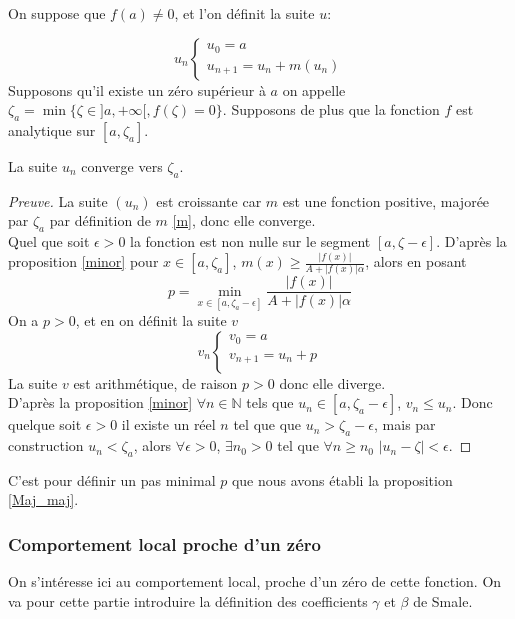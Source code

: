 \documentclass[a4paper,10pt]{article}
\begin{document}
	\noindent On suppose que $f(a) \neq 0$, et l'on définit la suite $u$:
	
	\begin{equation}
	u_n
	\left\lbrace
	\begin{array}{l}
	u_0=a\\
	u_{n+1}=u_n+m(u_n)
	\end{array}\right.
	\end{equation}
	Supposons qu'il existe un zéro supérieur à $a$ on appelle $\zeta_a=\min\{\zeta \in ]a,+\infty[, f(\zeta)=0\}$. Supposons de plus que la fonction $f$ est analytique sur $[a, \zeta_a]$.
	\begin{proposition}
		La suite $u_n$ converge vers $\zeta_a$.
	\end{proposition}
	\begin{proof}[Preuve]
		La suite $(u_n)$ est croissante car $m$ est une fonction positive, majorée par $\zeta_a$ par définition de $m$ \eqref{m}, donc elle converge.\\
		Quel que soit $\epsilon>0$ la fonction est non nulle sur le segment $[a, \zeta-\epsilon]$. D'après la proposition \ref{minor} pour $x \in [a,\zeta_a]$, $m(x)\geq \frac{|f(x)|}{A+|f(x)|\alpha}$,
		alors en posant 
		\[p=\min_{x \in [a,\zeta_a-\epsilon]}\frac{|f(x)|}{A+|f(x)|\alpha}\]
		On a $p>0$, et en on définit la suite $v$ 
		\begin{equation}
		v_n
		\left\lbrace
		\begin{array}{l}
		v_0=a\\
		v_{n+1}=u_n+p\\
		\end{array}\right.
		\end{equation}
		La suite $v$ est arithmétique, de raison $p>0$ donc elle diverge. \\
		D'après la proposition \ref{minor} $ \forall n \in \mathbb{N}$ tels que $u_n \in [a,\zeta_a-\epsilon]$, $v_n\leq u_n$. Donc quelque soit $\epsilon>0$ il existe un réel $n$ tel que que $u_n> \zeta_a-\epsilon$, mais par construction  $u_n<\zeta_a$, alors $\forall \epsilon>0$,  $\exists n_0>0$ tel que $\forall n\geq n_0$  $|u_n-\zeta|<\epsilon$.
	\end{proof}
	C'est pour définir un pas minimal $p$ que nous avons établi la proposition \ref{Maj_maj}.
	
	\subsubsection{Comportement local proche d'un zéro}
	On s'intéresse ici au comportement local, proche d'un zéro de cette fonction.
	On va pour cette partie introduire la définition des coefficients $\gamma$ et $\beta$ de Smale.
	
\end{document}
